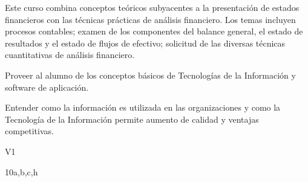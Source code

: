 \begin{syllabus}


\begin{justification}
Este curso combina conceptos teóricos subyacentes a la presentación de estados financieros con las técnicas prácticas de análisis financiero. Los temas incluyen procesos contables; examen de los componentes del balance general, el estado de resultados y el estado de flujos de efectivo; solicitud de las diversas técnicas cuantitativas de análisis financiero.\end{justification}

\begin{goals}
\item Proveer al alumno de los conceptos básicos de Tecnologías de la Información y software de aplicación.
\item Entender como la información es utilizada en las organizaciones y como la Tecnología de la Información permite aumento de calidad y ventajas competitivas.
\end{goals}

\begin{outcomes}{V1}
   \item {}
   \item {}
   \item {}
   \item {}
   \item {}
   \item {}
   \item {}
   \item {}
\end{outcomes}

\begin{unit}{\LUFIVEDef}{}{\LUFIVEBib}{10}{a,b,c,h}
   \begin{topics}
      \item \OMCTWOTopicTWOxTWOxONEOH
      \item \TDSONETopicTHREExONExONE
      \item \TDSONETopicTHREExONExTWO
      \item \TDSONETopicTHREExONExTHREE
      \item \TDSONETopicTHREExONExFOUR
      \item \TDSONETopicTHREExONExFIVE
   \end{topics}
	\LUFIVEGoal
\end{unit}

\begin{coursebibliography}
\end{coursebibliography}

\end{syllabus}
